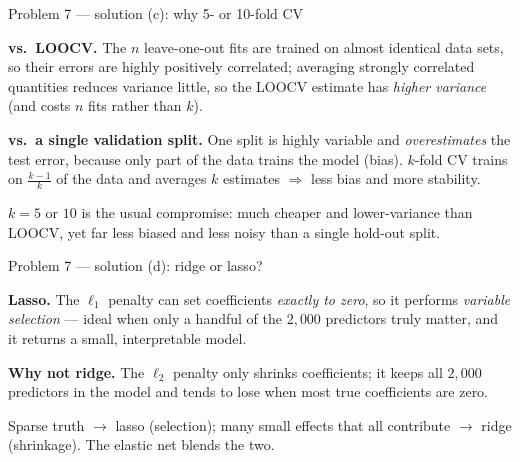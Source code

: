 \documentclass[aspectratio=169,11pt]{beamer}
\begin{document}
\begin{frame}{Problem 7 --- solution (c): why 5- or 10-fold CV}
  \begin{solutionbox}
    \textbf{vs.\ LOOCV.} The $n$ leave-one-out fits are trained on almost identical data sets, so
    their errors are highly positively correlated; averaging strongly correlated quantities reduces
    variance little, so the LOOCV estimate has \emph{higher variance} (and costs $n$ fits rather
    than $k$).
    \medskip

    \textbf{vs.\ a single validation split.} One split is highly variable and \emph{overestimates}
    the test error, because only part of the data trains the model (bias). $k$-fold CV trains on
    $\tfrac{k-1}{k}$ of the data and averages $k$ estimates $\Rightarrow$ less bias and more
    stability.
  \end{solutionbox}
  \begin{takeaway}
    \footnotesize $k=5$ or $10$ is the usual compromise: much cheaper and lower-variance than
    LOOCV, yet far less biased and less noisy than a single hold-out split.
  \end{takeaway}
\end{frame}

\begin{frame}{Problem 7 --- solution (d): ridge or lasso?}
  \begin{solutionbox}
    \textbf{Lasso.} The $\ell_1$ penalty can set coefficients \emph{exactly to zero}, so it
    performs \emph{variable selection} --- ideal when only a handful of the $2{,}000$ predictors
    truly matter, and it returns a small, interpretable model.
    \medskip

    \textbf{Why not ridge.} The $\ell_2$ penalty only shrinks coefficients; it keeps all
    $2{,}000$ predictors in the model and tends to lose when most true coefficients are zero.
  \end{solutionbox}
  \begin{takeaway}
    \footnotesize Sparse truth $\to$ lasso (selection); many small effects that all contribute
    $\to$ ridge (shrinkage). The elastic net blends the two.
  \end{takeaway}
\end{frame}
\end{document}
